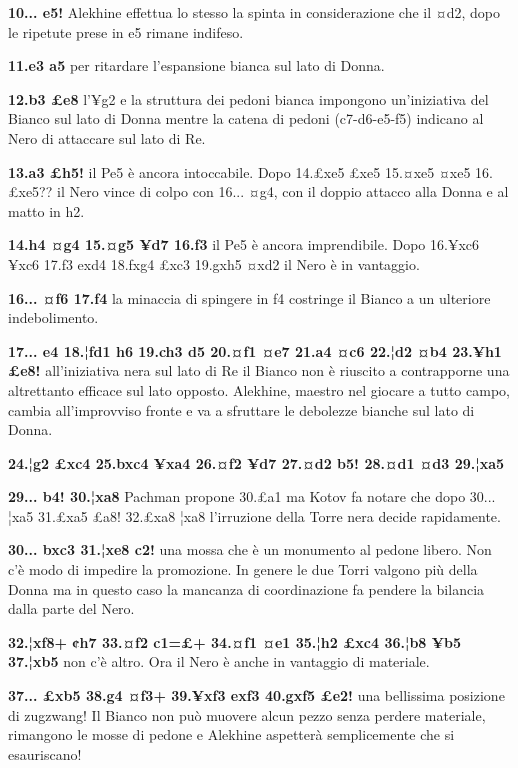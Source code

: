 \textbf{10... e5!} Alekhine effettua lo stesso la spinta in
considerazione che il ¤d2, dopo le ripetute prese in e5 rimane indifeso.

\textbf{11.e3 a5} per ritardare l'espansione bianca sul lato di Donna.

\textbf{12.b3 £e8} l'¥g2 e la struttura dei pedoni bianca impongono
un'iniziativa del Bianco sul lato di Donna mentre la catena di pedoni
(c7-d6-e5-f5) indicano al Nero di attaccare sul lato di Re.

\textbf{13.a3 £h5!} il Pe5 è ancora intoccabile. Dopo 14.£xe5 £xe5
15.¤xe5 ¤xe5 16.£xe5?? il Nero vince di colpo con 16... ¤g4, con il
doppio attacco alla Donna e al matto in h2.

\textbf{14.h4 ¤g4 15.¤g5 ¥d7 16.f3} il Pe5 è ancora imprendibile. Dopo
16.¥xc6 ¥xc6 17.f3 exd4 18.fxg4 £xc3 19.gxh5 ¤xd2 il Nero è in
vantaggio.

\textbf{16... ¤f6 17.f4} la minaccia di spingere in f4 costringe il
Bianco a un ulteriore indebolimento.

\textbf{17... e4 18.¦fd1 h6 19.ch3 d5 20.¤f1 ¤e7 21.a4 ¤c6 22.¦d2 ¤b4
23.¥h1 £e8!} all'iniziativa nera sul lato di Re il Bianco non è riuscito
a contrapporne una altrettanto efficace sul lato opposto. Alekhine,
maestro nel giocare a tutto campo, cambia all'improvviso fronte e va a
sfruttare le debolezze bianche sul lato di Donna.

\textbf{24.¦g2 £xc4 25.bxc4 ¥xa4 26.¤f2 ¥d7 27.¤d2 b5! 28.¤d1 ¤d3
29.¦xa5}


\textbf{29... b4! 30.¦xa8} Pachman propone 30.£a1 ma Kotov fa notare che
dopo 30... ¦xa5 31.£xa5 £a8! 32.£xa8 ¦xa8 l'irruzione della Torre nera
decide rapidamente.

\textbf{30... bxc3 31.¦xe8 c2!} una mossa che è un monumento al pedone
libero. Non c'è modo di impedire la promozione. In genere le due Torri
valgono più della Donna ma in questo caso la mancanza di coordinazione
fa pendere la bilancia dalla parte del Nero.

\textbf{32.¦xf8+ ¢h7 33.¤f2 c1=£+ 34.¤f1 ¤e1 35.¦h2 £xc4 36.¦b8 ¥b5
37.¦xb5} non c'è altro. Ora il Nero è anche in vantaggio di materiale.

\textbf{37... £xb5 38.g4 ¤f3+ 39.¥xf3 exf3 40.gxf5 £e2!} una bellissima
posizione di zugzwang! Il Bianco non può muovere alcun pezzo senza
perdere materiale, rimangono le mosse di pedone e Alekhine aspetterà
semplicemente che si esauriscano!


